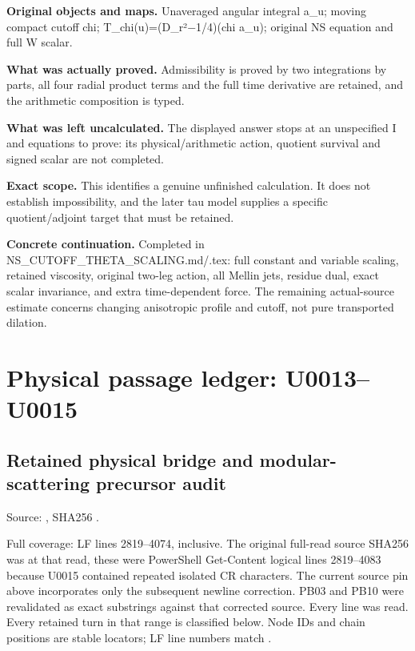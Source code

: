 \documentclass[10pt,a4paper,oneside]{report}
\begin{document}
\textbf{Original objects and maps.} Unaveraged angular integral a\_u;
moving compact cutoff chi;
T\_chi(u)=(D\_r²\allowbreak{}\ensuremath{−}\allowbreak{}1/4)(chi a\_u);
original NS equation and full W scalar.

\textbf{What was actually proved.} Admissibility is proved by two
integrations by parts, all four radial product terms and the full time
derivative are retained, and the arithmetic composition is typed.

\textbf{What was left uncalculated.} The displayed answer stops at an
unspecified I and equations to prove: its physical/arithmetic action,
quotient survival and signed scalar are not completed.

\textbf{Exact scope.} This identifies a genuine unfinished calculation.
It does not establish impossibility, and the later tau model supplies a
specific quotient/adjoint target that must be retained.

\textbf{Concrete continuation.} Completed in
NS\_CUTOFF\_THETA\_SCALING.md/.tex: full constant and variable scaling,
retained viscosity, original two-leg action, all Mellin jets, residue
dual, exact scalar invariance, and extra time-dependent force. The
remaining actual-source estimate concerns changing anisotropic profile
and cutoff, not pure transported dilation.

\section{Physical passage ledger:
U0013--U0015}\label{physical-passage-ledger-u0013u0015}

\subsection{Retained physical bridge and modular-scattering precursor
audit}\label{retained-physical-bridge-and-modular-scattering-precursor-audit}

Source:
\protect{},
SHA256
\protect{}.

Full coverage: LF lines 2819--4074, inclusive. The original full-read
source SHA256 was
\protect{}
at that read, these were PowerShell Get-Content logical lines 2819--4083
because U0015 contained repeated isolated CR characters. The current
source pin above incorporates only the subsequent newline correction.
PB03 and PB10 were revalidated as exact substrings against that
corrected source. Every line was read. Every retained turn in that range
is classified below. Node IDs and chain positions are stable locators;
LF line numbers match \protect{}.
\end{document}
